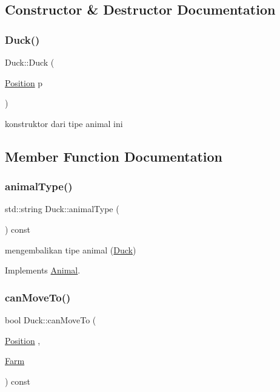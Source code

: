 \subsection{Constructor \& Destructor Documentation}
\mbox{\label{class_duck_a07712e5ee93186becd20ee07a16430e7}} 
\subsubsection{\texorpdfstring{Duck()}{Duck()}}
{\footnotesize\ttfamily Duck\+::\+Duck (\begin{DoxyParamCaption}\item[{\mbox{\hyperlink{class_position}{Position}}}]{p }\end{DoxyParamCaption})}

konstruktor dari tipe animal ini 

\subsection{Member Function Documentation}
\mbox{\label{class_duck_a90ea0823650fe49eddba0d24647dd1bd}} 
\subsubsection{\texorpdfstring{animalType()}{animalType()}}
{\footnotesize\ttfamily std\+::string Duck\+::animal\+Type (\begin{DoxyParamCaption}{ }\end{DoxyParamCaption}) const\hspace{0.3cm}{\ttfamily [virtual]}}

mengembalikan tipe animal (\mbox{\hyperlink{class_duck}{Duck}}) 

Implements \mbox{\hyperlink{class_animal_a1969cf8cf77a7900207420ae26f856e9}{Animal}}.

\mbox{\label{class_duck_a5b53ac1fbe028859bdc0149e6eeeef64}} 
\subsubsection{\texorpdfstring{canMoveTo()}{canMoveTo()}}
{\footnotesize\ttfamily bool Duck\+::can\+Move\+To (\begin{DoxyParamCaption}\item[{\mbox{\hyperlink{class_position}{Position}}}]{,  }\item[{\mbox{\hyperlink{class_farm}{Farm}}}]{ }\end{DoxyParamCaption}) const\hspace{0.3cm}{\ttfamily [virtual]}}

